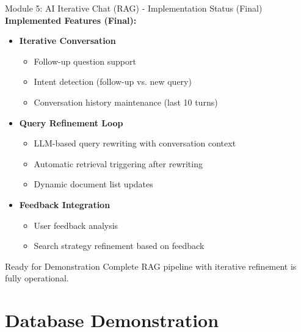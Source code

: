 \documentclass[aspectratio=169,xcolor=dvipsnames]{beamer}
\begin{document}
\begin{frame}{Module 5: AI Iterative Chat (RAG) - Implementation Status (Final)}
    \large
    \textbf{Implemented Features (Final):}
    \begin{itemize}
        \item \checkmark \textbf{Iterative Conversation}
        \begin{itemize}
            \normalsize
            \item Follow-up question support
            \item Intent detection (follow-up vs. new query)
            \item Conversation history maintenance (last 10 turns)
        \end{itemize}
        
        \vspace{0.5em}
        \item \checkmark \textbf{Query Refinement Loop}
        \begin{itemize}
            \normalsize
            \item LLM-based query rewriting with conversation context
            \item Automatic retrieval triggering after rewriting
            \item Dynamic document list updates
        \end{itemize}
        
        \vspace{0.5em}
        \item \checkmark \textbf{Feedback Integration}
        \begin{itemize}
            \normalsize
            \item User feedback analysis
            \item Search strategy refinement based on feedback
        \end{itemize}
    \end{itemize}
    
    \vspace{0.5em}
    \begin{block}{Ready for Demonstration}
        Complete RAG pipeline with iterative refinement is fully operational.
    \end{block}
\end{frame}

\section{Database Demonstration}
\end{document}
